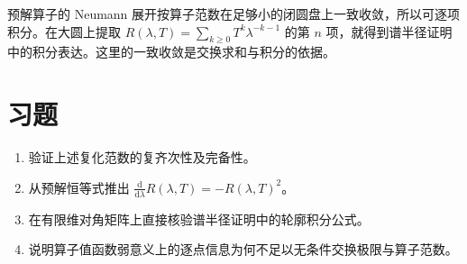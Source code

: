 预解算子的 Neumann 展开按算子范数在足够小的闭圆盘上一致收敛，所以可逐项积分。在大圆上提取 $R(\lambda,T)=\sum_{k\geq0}T^k\lambda^{-k-1}$ 的第 $n$ 项，就得到谱半径证明中的积分表达。这里的一致收敛是交换求和与积分的依据。

\section{习题}
\begin{enumerate}
 \item 验证上述复化范数的复齐次性及完备性。
 \item 从预解恒等式推出 $\frac{\mathrm d}{\mathrm d\lambda}R(\lambda,T)=-R(\lambda,T)^2$。
 \item 在有限维对角矩阵上直接核验谱半径证明中的轮廓积分公式。
 \item 说明算子值函数弱意义上的逐点信息为何不足以无条件交换极限与算子范数。
\end{enumerate}

